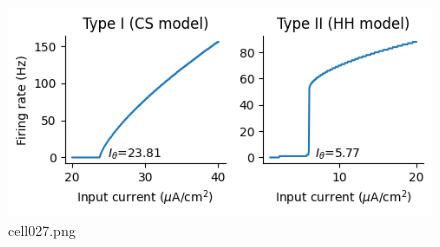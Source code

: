 \begin{figure}[ht]
	\centering
	\includegraphics[scale=0.8, max width=\linewidth]{./fig/neuron-model/hodgkin-huxley/cell027.png}
	\caption{cell027.png}
	\label{cell027.png}
\end{figure}